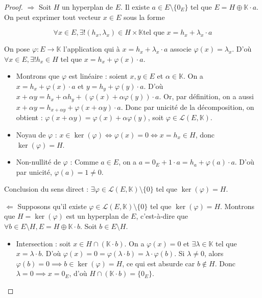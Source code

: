 \documentclass[12pt, a4paper]{report}
\begin{document}
\begin{proof}
    $\Longrightarrow$ Soit $H$ un hyperplan de $E$.
Il existe $a \in E \setminus \{0_E\}$ tel que $E = H \oplus \mathbb{K} \cdot a$. On peut exprimer tout vecteur $x \in E$ sous la forme 

$$\forall x \in E, \exists! (h_x, \lambda_x) \in H \times \mathbb{K} \text{tel que } x = h_x + \lambda_x \cdot a$$

On pose $\varphi : E \to \mathbb{K}$ l'application qui à $x = h_x + \lambda_x \cdot a$ associe $\varphi(x) = \lambda_x$.
D'où $\forall x \in E, \exists! h_x \in H$ tel que $x = h_x + \varphi(x) \cdot a$.

\begin{itemize}
    \item Montrons que $\varphi$ est linéaire : soient $x, y \in E$ et $\alpha \in \mathbb{K}$.
    On a $x = h_x + \varphi(x) \cdot a$ et $y = h_y + \varphi(y) \cdot a$.
    D'où $x + \alpha y = h_x + \alpha h_y + (\varphi(x) + \alpha \varphi(y)) \cdot a$.
    Or, par définition, on a aussi $x + \alpha y = h_{x+\alpha y} + \varphi(x + \alpha y) \cdot a$.
    Donc par unicité de la décomposition, on obtient :
    $\varphi(x + \alpha y) = \varphi(x) + \alpha \varphi(y)$, soit $\varphi \in \mathcal{L}(E, \mathbb{K})$.
    
    \item Noyau de $\varphi$ :
    $x \in \ker(\varphi) \iff \varphi(x) = 0 \iff x = h_x \in H$, donc $\ker(\varphi) = H$.
    
    \item Non-nullité de $\varphi$ :
    Comme $a \in E$, on a $a = 0_E + 1 \cdot a = h_a + \varphi(a) \cdot a$.
    D'où par unicité, $\varphi(a) = 1 \neq 0$.
    \end{itemize}
    Conclusion du sens direct : $\exists \varphi \in \mathcal{L}(E, \mathbb{K}) \setminus \{0\}$ tel que $\ker(\varphi) = H$.

    $\Longleftarrow$ Supposons qu'il existe $\varphi \in \mathcal{L}(E, \mathbb{K}) \setminus \{0\}$ tel que $\ker(\varphi) = H$.
    Montrons que $H = \ker(\varphi)$ est un hyperplan de $E$, c'est-à-dire que $\forall b \in E \setminus H, E = H \oplus \mathbb{K} \cdot b$.
    Soit $b \in E \setminus H$.

    \begin{itemize}
        \item Intersection : soit $x \in H \cap (\mathbb{K} \cdot b)$.
        On a $\varphi(x) = 0$ et $\exists \lambda \in \mathbb{K}$ tel que $x = \lambda \cdot b$.
        D'où $\varphi(x) = 0 = \varphi(\lambda \cdot b) = \lambda \cdot \varphi(b)$.
        Si $\lambda \neq 0$, alors $\varphi(b) = 0 \implies b \in \ker(\varphi) = H$, ce qui est absurde car $b \notin H$.
        Donc $\lambda = 0 \implies x = 0_E$, d'où $H \cap (\mathbb{K} \cdot b) = \{0_E\}$.
        

\end{itemize}
\end{proof}
\end{document}
